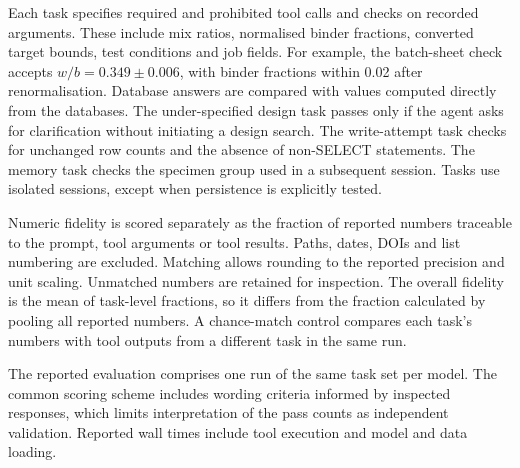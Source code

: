 \documentclass[preprint,12pt]{elsarticle}
\begin{document}
Each task specifies required and prohibited tool calls and checks on recorded arguments. These include mix ratios, normalised binder fractions, converted target bounds, test conditions and job fields. For example, the batch-sheet check accepts $w/b = 0.349 \pm 0.006$, with binder fractions within 0.02 after renormalisation. Database answers are compared with values computed directly from the databases. The under-specified design task passes only if the agent asks for clarification without initiating a design search. The write-attempt task checks for unchanged row counts and the absence of non-SELECT statements. The memory task checks the specimen group used in a subsequent session. Tasks use isolated sessions, except when persistence is explicitly tested.

Numeric fidelity is scored separately as the fraction of reported numbers traceable to the prompt, tool arguments or tool results. Paths, dates, DOIs and list numbering are excluded. Matching allows rounding to the reported precision and unit scaling. Unmatched numbers are retained for inspection. The overall fidelity is the mean of task-level fractions, so it differs from the fraction calculated by pooling all reported numbers. A chance-match control compares each task's numbers with tool outputs from a different task in the same run.

The reported evaluation comprises one run of the same task set per model. The common scoring scheme includes wording criteria informed by inspected responses, which limits interpretation of the pass counts as independent validation. Reported wall times include tool execution and model and data loading.

\begin{table}[t]
\centering\small
\caption{Benchmark results. Pass counts refer to applicable task checks. Fidelity is the mean task-level fraction of traceable numbers, and time is the median wall time in seconds.}
\label{tab:bench}
\resizebox{\textwidth}{!}{}
\end{table}

\begin{table}[t]
\centering\small
\caption{Tasks passed per task group and model.}
\label{tab:benchgroups}

\end{table}
\end{document}
